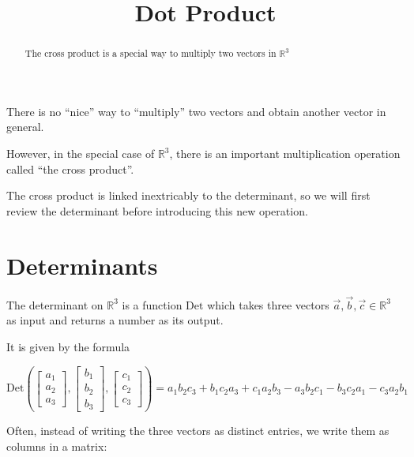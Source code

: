 \documentclass{ximera}
\title[Dig-In:]{Dot Product}
\begin{document}
\begin{abstract}
  The cross product is a special way to multiply two vectors in $\mathbb{R}^3$
\end{abstract}
\maketitle

There is no ``nice'' way to ``multiply'' two vectors and obtain another vector in general.

However, in the special case of $\mathbb{R}^3$, there is an important multiplication operation called ``the cross product''.  

The cross product is linked inextricably to the determinant, so we will first review the determinant before introducing this new operation.

\section{Determinants}

\begin{definition}
	The determinant on $\mathbb{R}^3$ is a function $\textrm{Det}$ which takes three vectors $\vec{a},\vec{b},\vec{c} \in \mathbb{R}^3$ as input and returns a number as its output.
	
	It is given by the formula
	
	\[
	\textrm{Det}\left(\begin{bmatrix} a_1 \\ a_2 \\a_3 \end{bmatrix}, \begin{bmatrix} b_1 \\ b_2 \\b_3 \end{bmatrix}, \begin{bmatrix} c_1 \\ c_2 \\c_3 \end{bmatrix} \right)  = a_1b_2c_3+b_1c_2a_3+c_1a_2b_3-a_3b_2c_1-b_3c_2a_1-c_3a_2b_1
	\]
	
	\end{definition}
	
	Often, instead of writing the three vectors as distinct entries, we write them as columns in a matrix:
	
\end{document}
